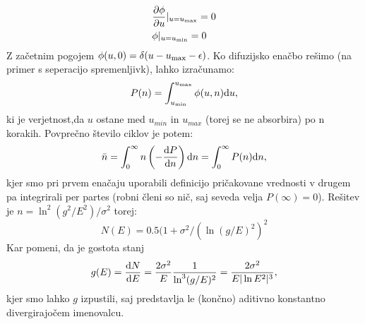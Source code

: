 \begin{align}
& \frac{\partial \phi}{\partial u} \vert_{u = u_{\textup{max}}} = 0 \\
& \phi \vert_{u = u_{\textup{min}}} = 0
\end{align}
Z začetnim pogojem $\phi (u, 0) = \delta ( u - u_{\textup{max}} - \epsilon)$.
Ko difuzijsko enačbo rešimo (na primer s seperacijo spremenljivk), lahko izračunamo:
\begin{equation}
P(n) = \int_{u_{\textup{min}}}^{u_{\textup{max}}} \phi(u,n) \textup{d} u,
\end{equation}
ki je verjetnost,da $u$ ostane med $u_{min}$ in $u_{max}$ (torej se ne absorbira) po n korakih.
Povprečno število ciklov je potem:
\begin{equation}
\bar{n} = \int_0^\infty n \left( - \frac{ \textup{d} P}{\textup{d} n} \right) \textup{d} n = \int_0^\infty P(n) \textup{d} n,
\end{equation}
kjer smo pri prvem enačaju uporabili definicijo pričakovane vrednosti v drugem pa integrirali per partes (robni členi so nič, saj seveda velja $P(\infty) = 0$).
Rešitev je $n =  \ln^2(g^2/E^2) / \sigma^2$ torej:
\begin{equation}
N(E) = 0.5 (1 + \sigma^2 / (\ln (g/E)^2)^2
\end{equation}
Kar pomeni, da je gostota stanj
\begin{equation}
g(E) = \frac{\textup{d} N}{\textup{d} E} = \frac{2 \sigma^2}{E} \frac{1}{\ln^3 (g/E)^2} = \frac{2 \sigma^2}{E |\ln E^2|^3},
\end{equation}
kjer smo lahko $g$ izpustili, saj predstavlja le (končno) aditivno konstantno divergirajočem imenovalcu.

